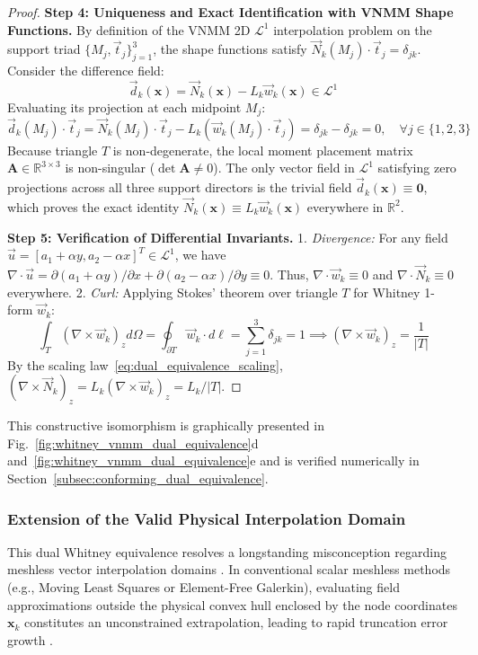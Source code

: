 \documentclass[preprint,12pt]{elsarticle}
\begin{document}
\begin{proof}
\textbf{Step 4: Uniqueness and Exact Identification with VNMM Shape Functions.} 
By definition of the VNMM 2D $\mathcal{L}^1$ interpolation problem on the support triad $\{M_j, \vec{t}_j\}_{j=1}^3$, the shape functions satisfy $\vec{N}_k(M_j) \cdot \vec{t}_j = \delta_{jk}$. Consider the difference field:
\begin{equation}
\vec{d}_k(\mathbf{x}) = \vec{N}_k(\mathbf{x}) - L_k \vec{w}_k(\mathbf{x}) \in \mathcal{L}^1
\end{equation}
Evaluating its projection at each midpoint $M_j$:
\begin{equation}
\vec{d}_k(M_j) \cdot \vec{t}_j = \vec{N}_k(M_j) \cdot \vec{t}_j - L_k \left( \vec{w}_k(M_j) \cdot \vec{t}_j \right) = \delta_{jk} - \delta_{jk} = 0, \quad \forall j \in \{1, 2, 3\}
\end{equation}
Because triangle $T$ is non-degenerate, the local moment placement matrix $\mathbf{A} \in \mathbb{R}^{3 \times 3}$ is non-singular ($\det \mathbf{A} \neq 0$). The only vector field in $\mathcal{L}^1$ satisfying zero projections across all three support directors is the trivial field $\vec{d}_k(\mathbf{x}) \equiv \mathbf{0}$, which proves the exact identity $\vec{N}_k(\mathbf{x}) \equiv L_k \vec{w}_k(\mathbf{x})$ everywhere in $\mathbb{R}^2$.

\textbf{Step 5: Verification of Differential Invariants.} 
1. \textit{Divergence:} For any field $\vec{u} = [a_1 + \alpha y, a_2 - \alpha x]^T \in \mathcal{L}^1$, we have $\nabla \cdot \vec{u} = \partial(a_1 + \alpha y)/\partial x + \partial(a_2 - \alpha x)/\partial y \equiv 0$. Thus, $\nabla \cdot \vec{w}_k \equiv 0$ and $\nabla \cdot \vec{N}_k \equiv 0$ everywhere.
2. \textit{Curl:} Applying Stokes' theorem over triangle $T$ for Whitney 1-form $\vec{w}_k$:
\begin{equation}
\int_T (\nabla \times \vec{w}_k)_z d\Omega = \oint_{\partial T} \vec{w}_k \cdot d\boldsymbol{\ell} = \sum_{j=1}^3 \delta_{jk} = 1 \implies (\nabla \times \vec{w}_k)_z = \frac{1}{|T|}
\end{equation}
By the scaling law~\eqref{eq:dual_equivalence_scaling}, $(\nabla \times \vec{N}_k)_z = L_k (\nabla \times \vec{w}_k)_z = L_k / |T|$.
\end{proof}

This constructive isomorphism is graphically presented in Fig.~\ref{fig:whitney_vnmm_dual_equivalence}d and~\ref{fig:whitney_vnmm_dual_equivalence}e and is verified numerically in Section~\ref{subsec:conforming_dual_equivalence}.


\subsubsection{Extension of the Valid Physical Interpolation Domain}
This dual Whitney equivalence resolves a longstanding misconception regarding meshless vector interpolation domains \cite{goncalves2025tese}. In conventional scalar meshless methods (e.g., Moving Least Squares or Element-Free Galerkin), evaluating field approximations outside the physical convex hull enclosed by the node coordinates $\mathbf{x}_k$ constitutes an unconstrained extrapolation, leading to rapid truncation error growth \cite{lima2017edge}.
\end{document}
